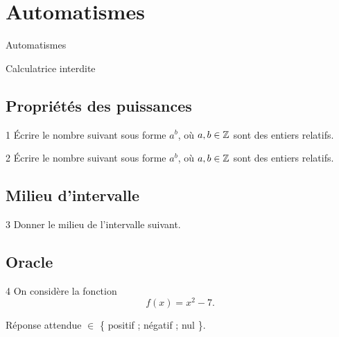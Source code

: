 
\AdvanceDate[1]



\section{Automatismes}

\begin{frame}

\centering \huge
Automatismes

\large
Calculatrice interdite

\end{frame}

\subsection{Propriétés des puissances}

\begin{frame}{1\vspace{-32pt}}
	Écrire le nombre suivant sous forme $a^b$, où $a, b \in \mathbb{Z}$ sont des entiers relatifs.
\end{frame}

\begin{frame}{2\vspace{-32pt}}
	Écrire le nombre suivant sous forme $a^b$, où $a, b \in \mathbb{Z}$ sont des entiers relatifs.
\end{frame}

\subsection{Milieu d'intervalle}

\begin{frame}{3\vspace{-32pt}}
	Donner le milieu de l'intervalle suivant.
	\boxAB{
		$[3 ; 12]$
	}{
		$[5 ; 10]$
	}
\end{frame}

\subsection{Oracle}

\begin{frame}{4\vspace{-32pt}}	
	On considère la fonction
		\[ f(x) = x^2 - 7. \]
	
	Réponse attendue $\in$ \{ positif ; négatif ; nul \}.
\end{frame}

